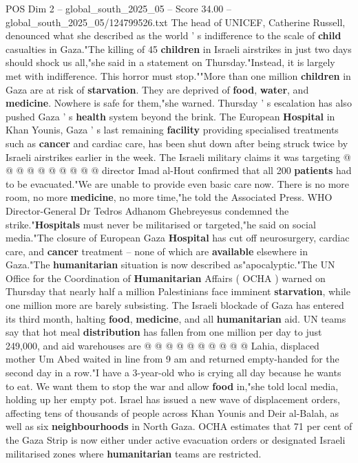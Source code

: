 \begin{textsample}{POS Dim 2 – global\_south\_2025\_05 – Score 34.00 – global\_south\_2025\_05/124799526.txt}
The head of UNICEF, Catherine Russell, denounced what she described as the world ' s indifference to the scale of \textbf{child} casualties in Gaza."The killing of 45 \textbf{children} in Israeli airstrikes in just two days should shock us all,"she said in a statement on Thursday."Instead, it is largely met with indifference.
This horror must stop.""More than one million \textbf{children} in Gaza are at risk of \textbf{starvation}.
They are deprived of \textbf{food}, \textbf{water}, and \textbf{medicine}.
Nowhere is safe for them,"she warned.
Thursday ' s escalation has also pushed Gaza ' s \textbf{health} system beyond the brink.
The European \textbf{Hospital} in Khan Younis, Gaza ' s last remaining \textbf{facility} providing specialised treatments such as \textbf{cancer} and cardiac care, has been shut down after being struck twice by Israeli airstrikes earlier in the week.
The Israeli military claims it was targeting @ @ @ @ @ @ @ @ @ @ director Imad al-Hout confirmed that all 200 \textbf{patients} had to be evacuated."We are unable to provide even basic care now.
There is no more room, no more \textbf{medicine}, no more time,"he told the Associated Press.
WHO Director-General Dr Tedros Adhanom Ghebreyesus condemned the strike."\textbf{Hospitals} must never be militarised or targeted,"he said on social media."The closure of European Gaza \textbf{Hospital} has cut off neurosurgery, cardiac care, and \textbf{cancer} treatment -- none of which are \textbf{available} elsewhere in Gaza."The \textbf{humanitarian} situation is now described as"apocalyptic."The UN Office for the Coordination of \textbf{Humanitarian} Affairs ( OCHA ) warned on Thursday that nearly half a million Palestinians face imminent \textbf{starvation}, while one million more are barely subsisting.
The Israeli blockade of Gaza has entered its third month, halting \textbf{food}, \textbf{medicine}, and all \textbf{humanitarian} aid.
UN teams say that hot meal \textbf{distribution} has fallen from one million per day to just 249,000, and aid warehouses are @ @ @ @ @ @ @ @ @ @ Lahia, displaced mother Um Abed waited in line from 9 am and returned empty-handed for the second day in a row."I have a 3-year-old who is crying all day because he wants to eat.
We want them to stop the war and allow \textbf{food} in,"she told local media, holding up her empty pot.
Israel has issued a new wave of displacement orders, affecting tens of thousands of people across Khan Younis and Deir al-Balah, as well as six \textbf{neighbourhoods} in North Gaza.
OCHA estimates that 71 per cent of the Gaza Strip is now either under active evacuation orders or designated Israeli militarised zones where \textbf{humanitarian} teams are restricted.

\end{textsample}
